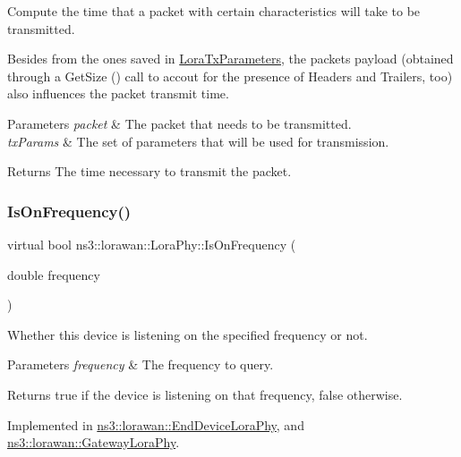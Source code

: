 Compute the time that a packet with certain characteristics will take to be transmitted.

Besides from the ones saved in \hyperlink{structns3_1_1lorawan_1_1LoraTxParameters}{Lora\+Tx\+Parameters}, the packet\textquotesingle{}s payload (obtained through a Get\+Size () call to accout for the presence of Headers and Trailers, too) also influences the packet transmit time.


\begin{DoxyParams}{Parameters}
{\em packet} & The packet that needs to be transmitted. \\
\hline
{\em tx\+Params} & The set of parameters that will be used for transmission. \\
\hline
\end{DoxyParams}
\begin{DoxyReturn}{Returns}
The time necessary to transmit the packet. 
\end{DoxyReturn}
\mbox{\label{classns3_1_1lorawan_1_1LoraPhy_a554597e30a17b099e8a7f68242cb16a7}} 
\subsubsection{\texorpdfstring{Is\+On\+Frequency()}{IsOnFrequency()}}
{\footnotesize\ttfamily virtual bool ns3\+::lorawan\+::\+Lora\+Phy\+::\+Is\+On\+Frequency (\begin{DoxyParamCaption}\item[{double}]{frequency }\end{DoxyParamCaption})\hspace{0.3cm}{\ttfamily [pure virtual]}}

Whether this device is listening on the specified frequency or not.


\begin{DoxyParams}{Parameters}
{\em frequency} & The frequency to query. \\
\hline
\end{DoxyParams}
\begin{DoxyReturn}{Returns}
true if the device is listening on that frequency, false otherwise. 
\end{DoxyReturn}


Implemented in \hyperlink{classns3_1_1lorawan_1_1EndDeviceLoraPhy_a70a83e7dde5b2ae33f6f47dbbf4ad0cd}{ns3\+::lorawan\+::\+End\+Device\+Lora\+Phy}, and \hyperlink{classns3_1_1lorawan_1_1GatewayLoraPhy_a293b678aaaf872fb1d6c0385bbab9d71}{ns3\+::lorawan\+::\+Gateway\+Lora\+Phy}.

